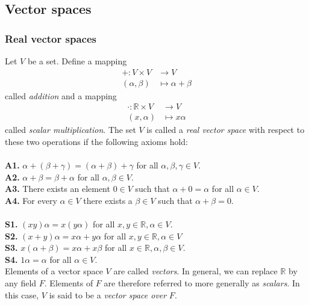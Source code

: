 \documentclass[12pt,letterpaper,reqno]{article}
\numberwithin{equation}{section}
\begin{document}
\subsection{Vector spaces}
\subsubsection{Real vector spaces}
\begin{defn} \label{def:vector_space}
	Let $V$ be a set. Define a mapping
\begin{align*}
	+:V\times V &\to V \\
	(\alpha,\beta) &\mapsto \alpha+\beta
\end{align*}
called \emph{addition} and a mapping
\begin{align*}
	\cdot :\mathbb{R}\times V &\to V \\
	(x,\alpha) &\mapsto x\alpha
\end{align*}
called \emph{scalar multiplication}. The set $V$ is called a \emph{real vector space} with respect to these two operations if the following axioms hold: \\
\\
{\bf A1.} $\alpha+(\beta+\gamma)=(\alpha+\beta)+\gamma$ for all  $\alpha,\beta,\gamma \in V$. \\
{\bf A2.} $\alpha+\beta=\beta+\alpha$ for all $\alpha,\beta \in V$. \\
{\bf A3.} There exists an element $0 \in V$ such that $\alpha+0=\alpha$ for all $\alpha \in V$. \\
{\bf A4.} For every $\alpha \in V$ there exists a $\beta \in V$ such that $\alpha+\beta=0$. \\
\\
{\bf S1.} $(xy)\alpha=x(y\alpha)$ for all $x,y \in \mathbb{R}, \alpha \in V$. \\
{\bf S2.} $(x+y)\alpha=x\alpha+y\alpha$ for all $x,y \in \mathbb{R}, \alpha \in V$ \\
{\bf S3.} $x(\alpha+\beta)=x\alpha+x\beta$ for all $x \in \mathbb{R}, \alpha,\beta \in V$. \\
{\bf S4.} $1\alpha=\alpha$ for all $\alpha \in V$. \\

Elements of a vector space $V$ are called \emph{vectors}. In general, we can replace $\mathbb{R}$ by any field $F$. Elements of $F$ are therefore referred to more generally as \emph{scalars}. In this case, $V$ is said to be a \emph{vector space over} $F$.
\end{defn}
\end{document}
